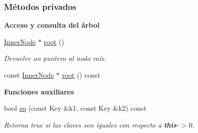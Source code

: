 \subsubsection*{Métodos privados}
\begin{Indent}\textbf{ Acceso y consulta del árbol}\par
\begin{DoxyCompactItemize}
\item 
\hyperlink{structaed2_1_1iterator_1_1InnerNode}{Inner\+Node} $\ast$ \hyperlink{classaed2_1_1iterator_aa442801bed510f7fde94e14bafada8a1_aa442801bed510f7fde94e14bafada8a1}{root} ()
\begin{DoxyCompactList}\small\item\em Devuelve un puntero al nodo raíz. \end{DoxyCompactList}\item 
const \hyperlink{structaed2_1_1iterator_1_1InnerNode}{Inner\+Node} $\ast$ \hyperlink{classaed2_1_1iterator_af8ec6345324ba983e64f210ccbc90b2c_af8ec6345324ba983e64f210ccbc90b2c}{root} () const
\end{DoxyCompactItemize}
\end{Indent}
\begin{Indent}\textbf{ Funciones auxiliares}\par
\begin{DoxyCompactItemize}
\item 
bool \hyperlink{classaed2_1_1iterator_ada09b8f1fe307abe0b9e01401e2172e1_ada09b8f1fe307abe0b9e01401e2172e1}{eq} (const Key \&k1, const Key \&k2) const
\begin{DoxyCompactList}\small\item\em Retorna true si las claves son iguales con respecto a {\bfseries this}-\/$>$lt. \end{DoxyCompactList}\end{DoxyCompactItemize}
\end{Indent}
